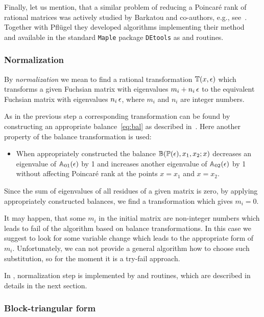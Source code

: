 \documentclass[12pt,a4paper]{article}
\def\M#1{\mathbb{#1}} %
\begin{document}
Finally, let us mention, that a similar problem of reducing a Poincar\'e rank of rational matrices was actively studied by Barkatou and co-authors, e.g., see~\cite{BP99}.
Together with Pfl\"ugel they developed algorithms implementing their method~\cite{BP99} and available in the standard \texttt{Maple} package \texttt{DEtools} as  and  routines.


\subsubsection{Normalization}

By {\em normalization} we mean to find a rational transformation $\M T(x,\eps)$ which transforms a given Fuchsian matrix with eigenvalues $m_i + n_i \, \epsilon$ to the equivalent Fuchsian matrix with eigenvalues $n_i \, \epsilon$, where $m_i$ and $n_i$ are integer numbers.

As in the previous step a corresponding transformation can be found by constructing an appropriate balance~\eqref{eq:bal} as described in~\cite[p.~11]{Lee15}.
Here another property of the balance transformation is used:
\begin{itemize}
  \item When appropriately constructed the balance $\M B(\M P(\eps), x_1, x_2; x)$ decreases an eigenvalue of $\M A_{01}(\eps)$ by 1 and increases another eigenvalue of $\M A_{02}(\eps)$ by 1 without affecting Poincar\'e rank at the points $x=x_1$ and $x=x_2$.
\end{itemize}
Since the sum of eigenvalues of all residues of a given matrix is zero, by applying appropriately constructed balances, we find a transformation which gives $m_i = 0$.

It may happen, that some $m_i$ in the initial matrix are non-integer numbers which leads to fail of the algorithm based on balance transformations.
In this case we suggest to look for some variable change which leads to the appropriate form of $m_i$.
Unfortunately, we can not provide a general algorithm how to choose such substitution, so for the moment it is a try-fail approach.

In \fuchsia, normalization step is implemented by  and  routines, which are described in details in the next section.


\subsubsection{Block-triangular form}
\end{document}
